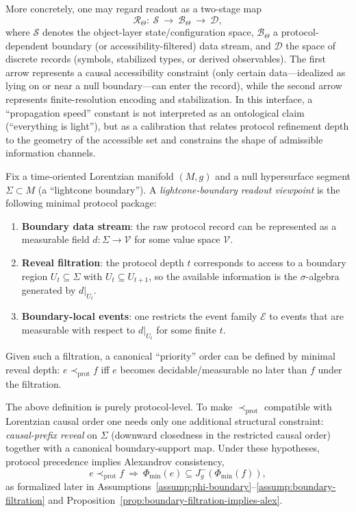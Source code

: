 More concretely, one may regard readout as a two-stage map
\[
\mathcal{R}_{\Theta}:\ \mathcal{S}\ \longrightarrow\ \mathcal{B}_{\Theta}\ \longrightarrow\ \mathcal{D},
\]
where $\mathcal{S}$ denotes the object-layer state/configuration space, $\mathcal{B}_{\Theta}$ a protocol-dependent boundary (or accessibility-filtered) data stream, and $\mathcal{D}$ the space of discrete records (symbols, stabilized types, or derived observables).
The first arrow represents a causal accessibility constraint (only certain data---idealized as lying on or near a null boundary---can enter the record), while the second arrow represents finite-resolution encoding and stabilization. In this interface, a ``propagation speed'' constant is not interpreted as an ontological claim (``everything is light''), but as a calibration that relates protocol refinement depth to the geometry of the accessible set and constrains the shape of admissible information channels.

\begin{definition}\label{def:lightcone-boundary-readout}
Fix a time-oriented Lorentzian manifold $(M,g)$ and a null hypersurface segment $\Sigma\subset M$ (a ``lightcone boundary'').
A \emph{lightcone-boundary readout viewpoint} is the following minimal protocol package:
\begin{enumerate}[label=(\roman*),leftmargin=*,itemsep=2pt]
  \item \textbf{Boundary data stream}: the raw protocol record can be represented as a measurable field $d:\Sigma\to\mathcal{V}$ for some value space $\mathcal{V}$.
  \item \textbf{Reveal filtration}: the protocol depth $t$ corresponds to access to a boundary region $U_t\subseteq \Sigma$ with $U_t\subseteq U_{t+1}$, so the available information is the $\sigma$-algebra generated by $d|_{U_t}$.
  \item \textbf{Boundary-local events}: one restricts the event family $\mathcal{E}$ to events that are measurable with respect to $d|_{U_t}$ for some finite $t$.
\end{enumerate}
Given such a filtration, a canonical ``priority'' order can be defined by minimal reveal depth: $e\prec_{\mathrm{prot}} f$ iff $e$ becomes decidable/measurable no later than $f$ under the filtration.
\end{definition}

\begin{remark}\label{rem:lightcone-minimal-assumptions}
The above definition is purely protocol-level. To make $\prec_{\mathrm{prot}}$ compatible with Lorentzian causal order one needs only one additional structural constraint: \emph{causal-prefix reveal} on $\Sigma$ (downward closedness in the restricted causal order) together with a canonical boundary-support map.
Under these hypotheses, protocol precedence implies Alexandrov consistency,
\[
e\prec_{\mathrm{prot}} f\ \Longrightarrow\ \Phi_{\min}(e)\subseteq J^-_g(\Phi_{\min}(f)),
\]
as formalized later in Assumptions~\ref{assump:phi-boundary}--\ref{assump:boundary-filtration} and Proposition~\ref{prop:boundary-filtration-implies-alex}.
\end{remark}

